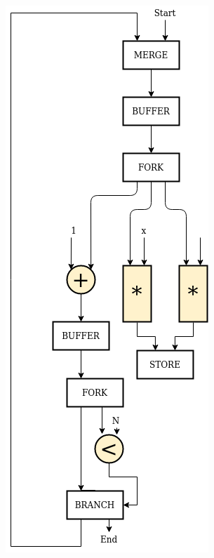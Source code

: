 \documentclass{beamer}
\begin{document}
\begin{frame}[fragile]
\begin{columns}[T]
\begin{column}{0.45\textwidth}
      \includegraphics[scale=0.25]{base_case.png}
    \end{column}
  \end{columns}
\end{frame}
\end{document}
